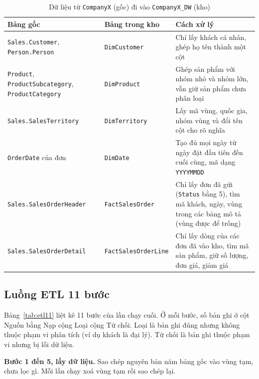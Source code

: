 \begin{table}[H]
\centering
\caption{Dữ liệu từ \texttt{CompanyX} (gốc) đi vào \texttt{CompanyX\_DW} (kho)}
\label{tab:anhxa}
\footnotesize
\begin{tabular}{p{3.8cm}p{3.0cm}p{7.6cm}}
\toprule
Bảng gốc & Bảng trong kho & Cách xử lý \\
\midrule
\texttt{Sales.Customer}, \texttt{Person.Person} & \texttt{DimCustomer} & Chỉ lấy khách cá nhân, ghép họ tên thành một cột \\
\texttt{Product}, \texttt{Product\allowbreak Subcategory}, \texttt{Product\allowbreak Category} & \texttt{DimProduct} & Ghép sản phẩm với nhóm nhỏ và nhóm lớn, vẫn giữ sản phẩm chưa phân loại \\
\texttt{Sales.SalesTerritory} & \texttt{DimTerritory} & Lấy mã vùng, quốc gia, nhóm vùng và đổi tên cột cho rõ nghĩa \\
\texttt{OrderDate} của đơn & \texttt{DimDate} & Tạo đủ mọi ngày từ ngày đặt đầu tiên đến cuối cùng, mã dạng \texttt{YYYYMMDD} \\
\texttt{Sales.\allowbreak SalesOrderHeader} & \texttt{Fact\allowbreak SalesOrder} & Chỉ lấy đơn đã gửi (\texttt{Status} bằng 5), tìm mã khách, ngày, vùng trong các bảng mô tả (vùng được để trống) \\
\texttt{Sales.\allowbreak SalesOrderDetail} & \texttt{Fact\allowbreak SalesOrderLine} & Chỉ lấy dòng của các đơn đã vào kho, tìm mã sản phẩm, giữ số lượng, đơn giá, giảm giá \\
\bottomrule
\end{tabular}
\end{table}

\subsection{Luồng ETL 11 bước}
Bảng~\ref{tab:etl11} liệt kê 11 bước của lần chạy cuối. Ở mỗi bước, số bản ghi ở cột Nguồn bằng Nạp cộng Loại cộng Từ chối. Loại là bản ghi đúng nhưng không thuộc phạm vi phân tích (ví dụ khách là đại lý). Từ chối là bản ghi thuộc phạm vi nhưng bị lỗi dữ liệu.

\begin{table}[H]
\centering
\caption{Mười một bước của lần chạy ETL cuối}
\label{tab:etl11}
\small
\resizebox{\textwidth}{!}{}
\end{table}

\textbf{Bước 1 đến 5, lấy dữ liệu.} Sao chép nguyên bản năm bảng gốc vào vùng tạm, chưa lọc gì. Mỗi lần chạy xoá vùng tạm rồi sao chép lại.

